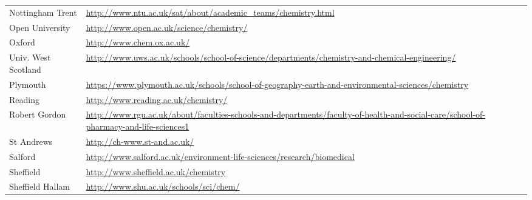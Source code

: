 \begin{table}[H]
\begin{tabular}{||p{4cm}|Y||}
 \footnotesize{Nottingham Trent}        & \footnotesize{\url{http://www.ntu.ac.uk/sat/about/academic\_teams/chemistry.html}}                                                                         \\
\footnotesize{ Open University }                   & \footnotesize{\url{http://www.open.ac.uk/science/chemistry/}}                                                                                             \\
 \footnotesize{Oxford}                             & \footnotesize{\url{http://www.chem.ox.ac.uk/}}                                                                                                            \\
 \footnotesize{Univ. West Scotland} & \footnotesize{\url{http://www.uws.ac.uk/schools/school-of-science/departments/chemistry-and-chemical-engineering/}}                                       \\
 \footnotesize{Plymouth               }            & \footnotesize{\url{https://www.plymouth.ac.uk/schools/school-of-geography-earth-and-environmental-sciences/chemistry}}                                    \\
\footnotesize{Reading               }             & \footnotesize{\url{http://www.reading.ac.uk/chemistry/}}                                                                                                  \\
 \footnotesize{Robert Gordon        }              & \footnotesize{\url{http://www.rgu.ac.uk/about/faculties-schools-and-departments/faculty-of-health-and-social-care/school-of-pharmacy-and-life-sciences1}} \\
 \footnotesize{St Andrews          }               & \footnotesize{\url{http://ch-www.st-and.ac.uk/}}                                                                                                          \\
 \footnotesize{Salford            }                & \footnotesize{\url{http://www.salford.ac.uk/environment-life-sciences/research/biomedical}}                                                               \\
 \footnotesize{Sheffield         }                 & \footnotesize{\url{http://www.sheffield.ac.uk/chemistry}}                                                                                                 \\
 \footnotesize{Sheffield Hallam }                  & \footnotesize{\url{http://www.shu.ac.uk/schools/sci/chem/}}                                                                                               \\

\end{tabular}
\end{table}
